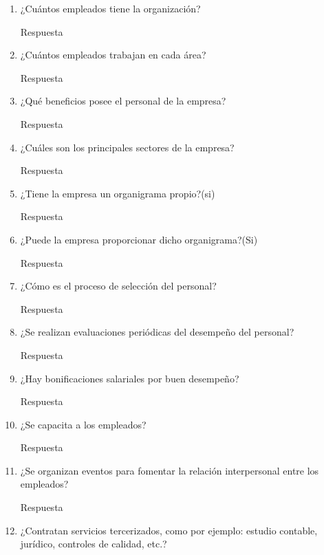 \documentclass[a4paper,10pt]{article}
\begin{document}
		
			\begin{enumerate}[resume]

			\item ¿Cuántos empleados tiene la organización?
			
			Respuesta
				
			\item ¿Cuántos empleados trabajan en cada área?
			
			Respuesta
				
			\item ¿Qué beneficios posee el personal de la empresa?
			
			Respuesta
			
			\item ¿Cuáles son los principales sectores de la empresa?
			
			Respuesta
			
			\item ¿Tiene la empresa un organigrama propio?(si)
			
			Respuesta
			
			\item ¿Puede la empresa proporcionar dicho organigrama?(Si)
			
			Respuesta
			
			\item ¿Cómo es el proceso de selección del personal? 
			
			Respuesta
			
			\item ¿Se realizan evaluaciones periódicas del desempeño del personal?
			
			Respuesta
			
			\item ¿Hay bonificaciones salariales por buen desempeño?
			
			Respuesta
			
			\item ¿Se capacita a los empleados?
			
			Respuesta
			
			\item ¿Se organizan eventos para fomentar la relación interpersonal entre los empleados?
			
			Respuesta
			
			\item ¿Contratan servicios tercerizados, como por ejemplo: estudio contable, jurídico, controles de calidad, etc.?

			\end{enumerate}
			
\end{document}
